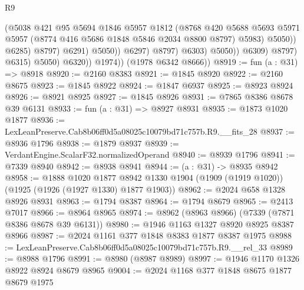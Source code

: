 \begin{lexlean}{R9}
\begin{coremodule}
                                            (@5038
                                              @421
                                              @95
                                              @5694
                                              @1846
                                              @5957
                                              @1812
                                              (@8768
                                                @420
                                                @5688
                                                @5693
                                                @5971
                                                @5957
                                                (@8774 @416 @5686 @1848 @5846 @2034 @8800 @8797)
                                                @5983)
                                              @5050))
                                          @6285)
                                        @8797)
                                      @6291)
                                    @5050))
                                @6297)
                              @8797)
                            @6303)
                          @5050))
                      @6309)
                    @8797)
                  @6315)
                @5050)
              @6320))
          @1974))
      (@1978 @6342 @8666))
@8919 := fun (a : @31) => @8918
@8920 := @2160 @8383
@8921 := @1845 @8920
@8922 := @2160 @8675
@8923 := @1845 @8922
@8924 := @1847 @6937
@8925 := @8923 @8924
@8926 := @8921 @8925
@8927 := @1845 @8926
@8931 := @7865 @8386 @8678 @39 @6131
@8933 := fun (a : @31) => @8927 @8931
@8935 := @1873 @1020 @1877
@8936 := LexLeanPreserve.Cab8b06ff0d5a08025c10079bd71c757b.R9.__fits_28
@8937 := @8936 @1796
@8938 := @1879 @8937
@8939 := VerdantEngine.ScalarF32.normalizedOperand
@8940 := @8939 @1796
@8941 := @7339 @8940
@8942 := @8938 @8941
@8944 := (a : @31) -> @8935 @8942
@8958 := @1888
    @1020
    @1877
    @8942
    @1330
    @1904
    (@1909 (@1919 @1020))
    (@1925 (@1926 (@1927 @1330) @1877 @1903))
@8962 := @2024 @658 @1328 @8926 @8931
@8963 := @1794 @8387
@8964 := @1794 @8679
@8965 := @2413 @7017
@8966 := @8964 @8965
@8974 := @8962 (@8963 @8966) (@7339 (@7871 @8386 @8678 @39 @6131))
@8980 := @1946 @1163 @1327 @8920 @8925 @8387 @8966
@8987 := @2024 @1161 @377 @1848 @8383 @1877 @8387 @1975
@8988 := LexLeanPreserve.Cab8b06ff0d5a08025c10079bd71c757b.R9.__rel_33
@8989 := @8988 @1796
@8991 := @8980 (@8987 @8989)
@8997 := @1946 @1170 @1326 @8922 @8924 @8679 @8965
@9004 := @2024 @1168 @377 @1848 @8675 @1877 @8679 @1975

\end{coremodule}
\end{lexlean}
